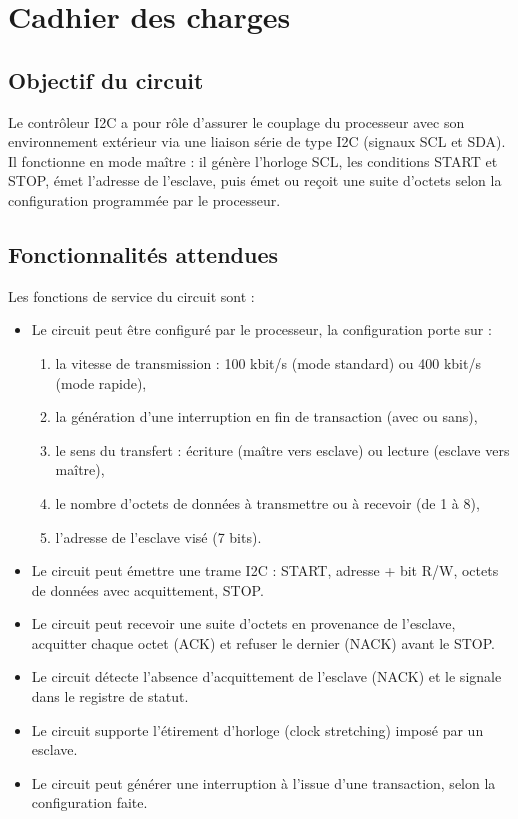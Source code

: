\section{Cadhier des charges}

\subsection{Objectif du circuit}

Le contrôleur I2C a pour rôle d'assurer le couplage du processeur avec son
environnement extérieur via une liaison série de type I2C (signaux SCL et SDA). Il
fonctionne en mode maître : il génère l'horloge SCL, les conditions START et STOP, émet
l'adresse de l'esclave, puis émet ou reçoit une suite d'octets selon la configuration
programmée par le processeur.
\\

\subsection{Fonctionnalités attendues}

Les fonctions de service du circuit sont :
\\

\begin{itemize}
    \item Le circuit peut être configuré par le processeur, la configuration porte sur :
    \begin{enumerate}
        \item la vitesse de transmission : 100 kbit/s (mode standard) ou 400 kbit/s (mode rapide),
        \item la génération d'une interruption en fin de transaction (avec ou sans),
        \item le sens du transfert : écriture (maître vers esclave) ou lecture (esclave vers maître),
        \item le nombre d'octets de données à transmettre ou à recevoir (de 1 à 8),
        \item l'adresse de l'esclave visé (7 bits).
    \end{enumerate}
    \item Le circuit peut émettre une trame I2C : START, adresse + bit R/W, octets de données avec acquittement, STOP.
    \item Le circuit peut recevoir une suite d'octets en provenance de l'esclave, acquitter chaque octet (ACK) et refuser le dernier (NACK) avant le STOP.
    \item Le circuit détecte l'absence d'acquittement de l'esclave (NACK) et le signale dans le registre de statut.
    \item Le circuit supporte l'étirement d'horloge (clock stretching) imposé par un esclave.
    \item Le circuit peut générer une interruption à l'issue d'une transaction, selon la configuration faite.
\end{itemize}

